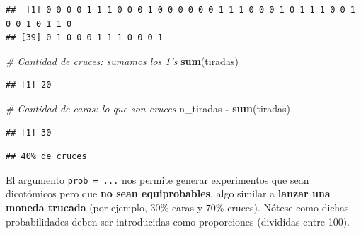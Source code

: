 \documentclass[11pt,]{book}
\newenvironment{Shaded}{\begin{snugshade}}{\end{snugshade}}
\newcommand{\CommentTok}[1]{\textcolor[rgb]{0.37,0.37,0.37}{\textit{#1}}}
\newcommand{\DataTypeTok}[1]{\textcolor[rgb]{0.27,0.27,0.27}{#1}}
\newcommand{\DecValTok}[1]{\textcolor[rgb]{0.06,0.06,0.06}{#1}}
\newcommand{\FloatTok}[1]{\textcolor[rgb]{0.06,0.06,0.06}{#1}}
\newcommand{\KeywordTok}[1]{\textcolor[rgb]{0.27,0.27,0.27}{\textbf{#1}}}
\newcommand{\NormalTok}[1]{#1}
\newcommand{\OperatorTok}[1]{\textcolor[rgb]{0.43,0.43,0.43}{\textbf{#1}}}
\newcommand{\OtherTok}[1]{\textcolor[rgb]{0.37,0.37,0.37}{#1}}
\newcommand{\StringTok}[1]{\textcolor[rgb]{0.5,0.5,0.5}{#1}}
\begin{document}
\begin{verbatim}
##  [1] 0 0 0 0 1 1 1 0 0 0 1 0 0 0 0 0 0 1 1 1 0 0 0 1 0 1 1 1 0 0 1 0 0 1 0 1 1 0
## [39] 0 1 0 0 0 1 1 1 0 0 0 1
\end{verbatim}

\begin{Shaded}
\begin{Highlighting}[]
\CommentTok{# Cantidad de cruces: sumamos los 1's}
\KeywordTok{sum}\NormalTok{(tiradas)}
\end{Highlighting}
\end{Shaded}

\begin{verbatim}
## [1] 20
\end{verbatim}

\begin{Shaded}
\begin{Highlighting}[]
\CommentTok{# Cantidad de caras: lo que son cruces}
\NormalTok{n_tiradas }\OperatorTok{-}\StringTok{ }\KeywordTok{sum}\NormalTok{(tiradas)}
\end{Highlighting}
\end{Shaded}

\begin{verbatim}
## [1] 30
\end{verbatim}

\begin{Shaded}
\end{Shaded}

\begin{verbatim}
## 40% de cruces
\end{verbatim}

El argumento \texttt{prob\ =\ ...} nos permite generar experimentos que sean dicotómicos pero que \textbf{no sean equiprobables}, algo similar a \textbf{lanzar una moneda trucada} (por ejemplo, 30\% caras y 70\% cruces). Nótese como dichas probabilidades deben ser introducidas como proporciones (divididas entre 100).

\begin{Shaded}
\end{Shaded}
\end{document}
